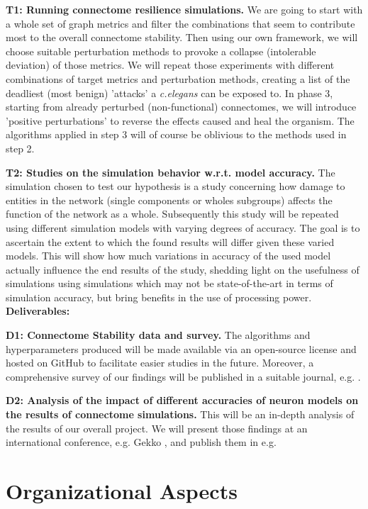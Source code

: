 \documentclass[a4paper,11pt]{article}
\begin{document}
\textbf{T1: Running connectome resilience simulations.} 
We are going to start with a whole set of graph metrics and filter the combinations that seem to contribute most to the overall connectome stability. Then using our own framework, we will choose suitable perturbation methods to provoke a collapse (intolerable deviation) of those metrics. We will repeat those experiments with different combinations of target metrics and perturbation methods, creating a list of the deadliest (most benign) 'attacks' a \emph{c.elegans} can be exposed to. In phase 3, starting from already perturbed (non-functional) connectomes, we will introduce 'positive perturbations' to reverse the effects caused and heal the organism. The algorithms applied in step 3 will of course be oblivious to the methods used in step 2.


\textbf{T2: Studies on the simulation behavior w.r.t. model accuracy.}
The simulation chosen to test our hypothesis is a study concerning how damage to entities in the network (single components or wholes subgroups) affects the function of the network as a whole. Subsequently this study will be repeated using different simulation models with varying degrees of accuracy. The goal is to ascertain the extent to which the found results will differ given these varied models. This will show how much variations in accuracy of the used model actually influence the end results of the study, shedding light on the usefulness of simulations using simulations which may not be state-of-the-art in terms of simulation accuracy, but bring benefits in the use of processing power.
\\[0,2cm]


\textbf{Deliverables:} 

\textbf{D1: Connectome Stability data and survey.}
The algorithms and hyperparameters produced will be made available via an open-source license and hosted on GitHub to facilitate easier studies in the future. Moreover, a comprehensive survey of our findings will be published in a suitable journal, e.g. .

\textbf{D2: Analysis of the impact of different accuracies of neuron models on the results of connectome simulations.} This will be an in-depth analysis of the results of our overall project. We will present those findings at an international conference, e.g. Gekko , and publish them in e.g. 


\newpage

\section{Organizational Aspects}
\end{document}
